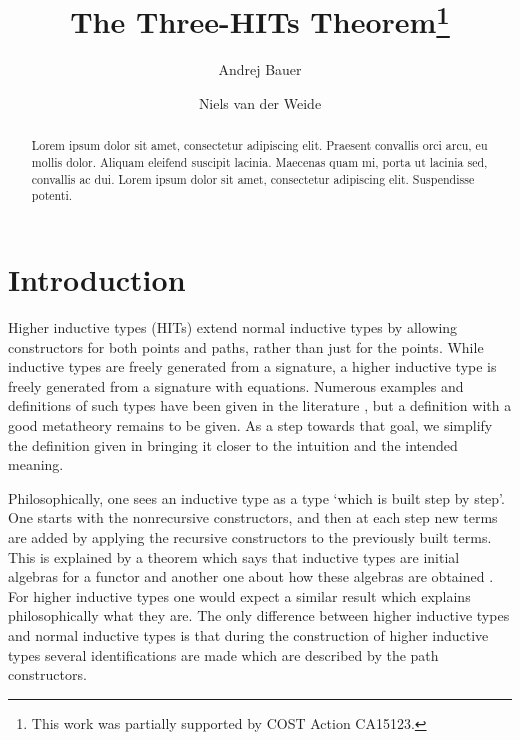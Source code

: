 \documentclass[a4paper,UKenglish]{lipics-v2016}
\title{The Three-HITs Theorem\footnote{This work was partially supported by COST Action CA15123.}}
\author[1]{Andrej Bauer}
\author[2]{Niels van der Weide}
\affil[1]{Department of Mathematics and Physics, University of Ljubljana, Ljubljana, Slovenia\\
  \texttt{Andrej.Bauer@andrej.com}}
\affil[2]{Department of Computer Science, Radboud University, Nijmegen, The Netherlands\\
  \texttt{nweide@cs.ru.nl}}
\begin{document}
\maketitle

\begin{abstract}
Lorem ipsum dolor sit amet, consectetur adipiscing elit. Praesent convallis orci arcu, eu mollis dolor. Aliquam eleifend suscipit lacinia. Maecenas quam mi, porta ut lacinia sed, convallis ac dui. Lorem ipsum dolor sit amet, consectetur adipiscing elit. Suspendisse potenti. 
 \end{abstract}

\section{Introduction}
Higher inductive types (HITs) extend normal inductive types by allowing constructors for both points and paths, rather than just for the points.
While inductive types are freely generated from a signature, a higher inductive type is freely generated from a signature with equations.
Numerous examples and definitions of such types have been given in the literature \cite{altenkirch2016quotient,awodey2012inductive,basoldhigher,sojakova2015higher,hottbook}, but a definition with a good metatheory remains to be given.
As a step towards that goal, we simplify the definition given in \cite{basoldhigher} bringing it closer to the intuition and the intended meaning.

Philosophically, one sees an inductive type as a type `which is built step by step'.
One starts with the nonrecursive constructors, and then at each step new terms are added by applying the recursive constructors to the previously built terms.
This is explained by a theorem which says that inductive types are initial algebras for a functor \cite{dybjer1994inductive,dybjer2003induction} and another one about how these algebras are obtained \cite{adamek1974free}.
For higher inductive types one would expect a similar result which explains philosophically what they are.
The only difference between higher inductive types and normal inductive types is that during the construction of higher inductive types several identifications are made which are described by the path constructors.
\end{document}
